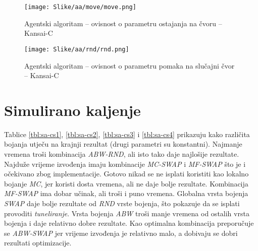 \documentclass[times, utf8, diplomski, numeric]{fer}
\begin{document}
\begin{figure}[htb]
	\texttt{[image: Slike/aa/move/move.png]}
	\caption{Agentski algoritam -- ovisnost o parametru ostajanja na čvoru -- Kansai-C}
	\label{fig:agent_alg_move}
\end{figure}


\begin{figure}[htb]
	\texttt{[image: Slike/aa/rnd/rnd.png]}
	\caption{Agentski algoritam -- ovisnost o parametru pomaka na slučajni čvor -- Kansai-C}
	\label{fig:agent_alg_rnd}
\end{figure}

\clearpage


\section{Simulirano kaljenje}

Tablice \ref{tbl:sa-cs1}, \ref{tbl:sa-cs2}, \ref{tbl:sa-cs3} i \ref{tbl:sa-cs4} prikazuju kako različita bojanja utječu na krajnji rezultat (drugi parametri su konstantni). Najmanje vremena troši kombinacija \emph{ABW-RND}, ali isto tako daje najlošije rezultate. Najduže vrijeme izvođenja imaju kombinacije \emph{MC-SWAP} i \emph{MF-SWAP} što je i očekivano zbog implementacije. Gotovo nikad se ne isplati koristiti kao lokalno bojanje \emph{MC}, jer koristi dosta vremena, ali ne daje bolje rezultate. Kombinacija \emph{MF-SWAP} ima dobar učinak, ali troši i puno vremena. Globalna vrsta bojenja \emph{SWAP} daje bolje rezultate od \emph{RND} vrste bojenja, što pokazuje da se isplati provoditi \emph{tuneliranje}. Vrsta bojenja \emph{ABW} troši manje vremena od ostalih vrsta bojenja i daje relativno dobre rezultate. Kao optimalna kombinacija preporučuje se \emph{ABW-SWAP} jer vrijeme izvođenja je relativno malo, a dobivaju se dobri rezultati optimizacije.
\end{document}
